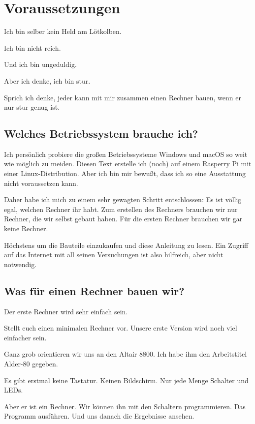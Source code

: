 \documentclass[a5paper,ngerman]{article}
\begin{document}
\section{Voraussetzungen}
\begin{multicols}{2}

Ich bin selber kein Held am Lötkolben.

Ich bin nicht reich.

Und ich bin ungeduldig.

Aber ich denke, ich bin stur.

Sprich ich denke, jeder kann mit mir zusammen einen Rechner bauen,
wenn er nur stur genug ist.

\subsection{Welches Betriebssystem brauche ich?}

Ich persönlich probiere die großen Betriebssysteme Windows und macOS so
weit wie möglich zu meiden.
Diesen Text erstelle ich (noch) auf einem Rasperry Pi mit einer
Linux-Distribution.
Aber ich bin mir bewußt, dass ich so eine Ausstattung nicht voraussetzen
kann.

Daher habe ich mich zu einem sehr gewagten Schritt entschlossen:
Es ist völlig egal, welchen Rechner ihr habt.
Zum erstellen des Rechners brauchen wir nur Rechner, die wir selbst
gebaut haben.
Für die ersten Rechner brauchen wir gar keine Rechner.

Höchstens um die Bauteile einzukaufen und diese Anleitung zu lesen.
Ein Zugriff auf das Internet mit all seinen Versuchungen ist also
hilfreich, aber nicht notwendig.

\subsection{Was für einen Rechner bauen wir?}

Der erste Rechner wird sehr einfach sein.

Stellt euch einen minimalen Rechner vor.
Unsere erste Version wird noch viel einfacher sein.

Ganz grob orientieren wir uns an den Altair 8800.
Ich habe ihm den Arbeitstitel Alder-80 gegeben.

Es gibt erstmal keine Tastatur.
Keinen Bildschirm.
Nur jede Menge Schalter und LEDs.

Aber er ist ein Rechner.
Wir können ihn mit den Schaltern programmieren.
Das Programm ausführen.
Und uns danach die Ergebnisse ansehen.


\end{multicols}
\end{document}
